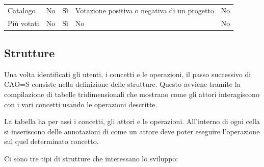 \documentclass[12pt,italian,]{report}
\begin{document}
\begin{longtable}[]{lllll}
\begin{minipage}[t]{0.17\columnwidth}\raggedright
Catalogo\strut
\end{minipage} & \begin{minipage}[t]{0.17\columnwidth}\raggedright
No\strut
\end{minipage} & \begin{minipage}[t]{0.17\columnwidth}\raggedright
Sì\strut
\end{minipage} & \begin{minipage}[t]{0.17\columnwidth}\raggedright
Votazione positiva o negativa di un progetto\strut
\end{minipage} & \begin{minipage}[t]{0.17\columnwidth}\raggedright
No\strut
\end{minipage}\tabularnewline
\begin{minipage}[t]{0.17\columnwidth}\raggedright
Più votati\strut
\end{minipage} & \begin{minipage}[t]{0.17\columnwidth}\raggedright
No\strut
\end{minipage} & \begin{minipage}[t]{0.17\columnwidth}\raggedright
Sì\strut
\end{minipage} & \begin{minipage}[t]{0.17\columnwidth}\raggedright
No\strut
\end{minipage} & \begin{minipage}[t]{0.17\columnwidth}\raggedright
No\strut
\end{minipage}\tabularnewline
\bottomrule
\end{longtable}

\subsection{Strutture}\label{strutture}

Una volta identificati gli utenti, i concetti e le operazioni, il passo
successivo di CAO=S consiste nella definizione delle strutture. Questo
avviene tramite la compilazione di tabelle tridimensionali che mostrano
come gli attori interagiscono con i vari concetti usando le operazioni
descritte.

La tabella ha per assi i concetti, gli attori e le operazioni. All'interno di ogni cella si inseriscono delle annotazioni di come un attore deve poter eseguire l'operazione sul quel determinato concetto.

Ci sono tre tipi di strutture che interessano lo sviluppo:
\end{document}
